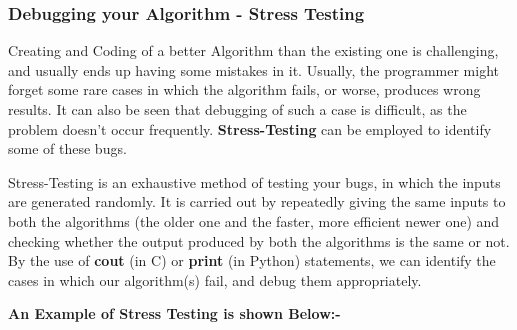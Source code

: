 \documentclass{article}
\theoremstyle{definition}
\theoremstyle{example}
\begin{document}
\subsubsection{\Large Debugging your Algorithm - Stress Testing}
\hspace{6mm}Creating and Coding of a better Algorithm than the existing one is challenging, and usually ends up having some mistakes in it. Usually, the programmer might forget some rare cases in which the algorithm fails, or worse, produces wrong results. It can also be seen that debugging of such a case is difficult, as the problem doesn't occur frequently. \textbf{Stress-Testing} can be employed to identify some of these bugs. \par
\vspace{5mm}
Stress-Testing is an exhaustive method of testing your bugs, in which the inputs are generated randomly. It is carried out by repeatedly giving the same inputs to both the algorithms (the older one and the faster, more efficient newer one) and checking whether the output produced by both the algorithms is the same or not. By the use of \textbf{cout} (in C) or \textbf{print} (in Python) statements, we can identify the cases in which our algorithm(s) fail, and debug them appropriately. \par
\newpage
\noindent \textbf{An Example of Stress Testing is shown Below:-}\par
\vspace{5mm}
\end{document}
